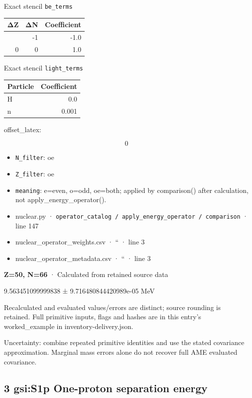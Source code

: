 \documentclass[
  11pt,
  letterpaper,
]{article}
\begin{document}
Exact stencil \texttt{be\_terms}

\begin{longtable}[]{@{}rrr@{}}
\toprule\noalign{}
ΔZ & ΔN & Coefficient \\
\midrule\noalign{}
\endhead
\bottomrule\noalign{}
\endlastfoot
0 & -1 & -1.0 \\
0 & 0 & 1.0 \\
\end{longtable}

Exact stencil \texttt{light\_terms}

\begin{longtable}[]{@{}lr@{}}
\toprule\noalign{}
Particle & Coefficient \\
\midrule\noalign{}
\endhead
\bottomrule\noalign{}
\endlastfoot
H & 0.0 \\
n & 0.001 \\
\end{longtable}

offset\_latex:

\[
0
\]

\begin{itemize}
\item
  \texttt{N\_filter}: oe
\item
  \texttt{Z\_filter}: oe
\item
  \texttt{meaning}: e=even, o=odd, oe=both; applied by comparison()
  after calculation, not apply\_energy\_operator().
\item
  nuclear.py ·
  \texttt{operator\_catalog\ /\ apply\_energy\_operator\ /\ comparison}
  · line 147
\item
  nuclear\_operator\_weights.csv · `` · line 3
\item
  nuclear\_operator\_metadata.csv · `` · line 3
\end{itemize}

\textbf{Z=50, N=66} · Calculated from retained source data

9.563451099999838 ± 9.716480844420989e-05 MeV

Recalculated and evaluated values/errors are distinct; source rounding
is retained. Full primitive inputs, flags and hashes are in this entry's
worked\_example in inventory-delivery.json.

Uncertainty: combine repeated primitive identities and use the stated
covariance approximation. Marginal mass errors alone do not recover full
AME evaluated covariance.

\subsection{3 gsi:S1p One-proton separation
energy}\label{gsis1p-one-proton-separation-energy}
\end{document}
